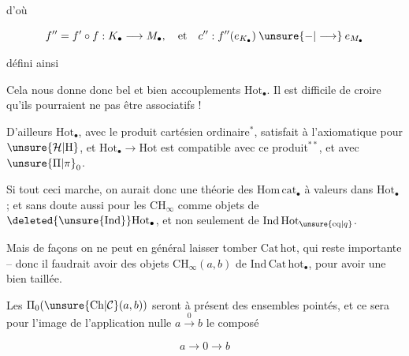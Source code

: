 
d'où

\[
 f''=f'\circ f:K_\bullet\longrightarrow M_\bullet,\quad\text{et}\quad c'':f''(e_{K_\bullet})\mathbin{\unsure{-|\longrightarrow}}e_{M_\bullet}
\]

défini ainsi


Cela nous donne donc bel et bien accouplements  $\mathrm{Hot}_{\bullet}$. Il est difficile de croire qu'ils pourraient ne pas être associatifs !


D'ailleurs $\mathrm{Hot}_{\bullet}$, avec le produit cartésien ordinaire$^{*}$, satisfait à l'axiomatique   pour $\unsure{\mathcal H|\mathrm H}$, et $\mathrm{Hot}_{\bullet}\longrightarrow\mathrm{Hot}$ est compatible avec ce produit$^{**}$, et avec $\unsure{\Pi|\pi}_0$.



Si tout ceci marche, on aurait donc une théorie des $\mathrm{Hom\,cat}_{\bullet}$ à valeurs dans $\mathrm{Hot}_{\bullet}$ ; et sans doute aussi pour les $\mathrm{CH}_{\infty}$ comme objets de $\deleted{\unsure{\mathrm{Ind}}}\mathrm{Hot}_{\bullet}$, et non seulement de $\mathrm{Ind\,Hot}_{\unsure{\mathrm{eq}|q}}$.

Mais de  façons on ne peut en général laisser tomber $\mathrm{Cat\,hot}$, qui reste importante -- donc il faudrait avoir des objets $\mathrm{CH}_{\infty}(a,b)$ de $\mathrm{Ind\,Cat\,hot}_{\bullet}$, pour avoir une  bien taillée.

Les $\Pi_0(\unsure{\mathrm{Ch}|\mathcal C}(a,b))$ seront à présent des ensembles pointés, et ce sera pour l'image de l'application nulle $a\xrightarrow{0}b$  le composé

\[
 a\longrightarrow 0\longrightarrow b
\]
